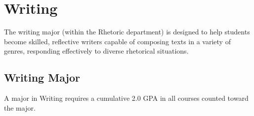 \documentclass[
  letterpaper,
]{scrbook}
\begin{document}
\section{Writing}\label{writing}

The writing major (within the Rhetoric department) is designed to help
students become skilled, reflective writers capable of composing texts
in a variety of genres, responding effectively to diverse rhetorical
situations.

\subsection{Writing Major}\label{writing-major}

A major in Writing requires a cumulative 2.0 GPA in all courses counted
toward the major.
\end{document}
